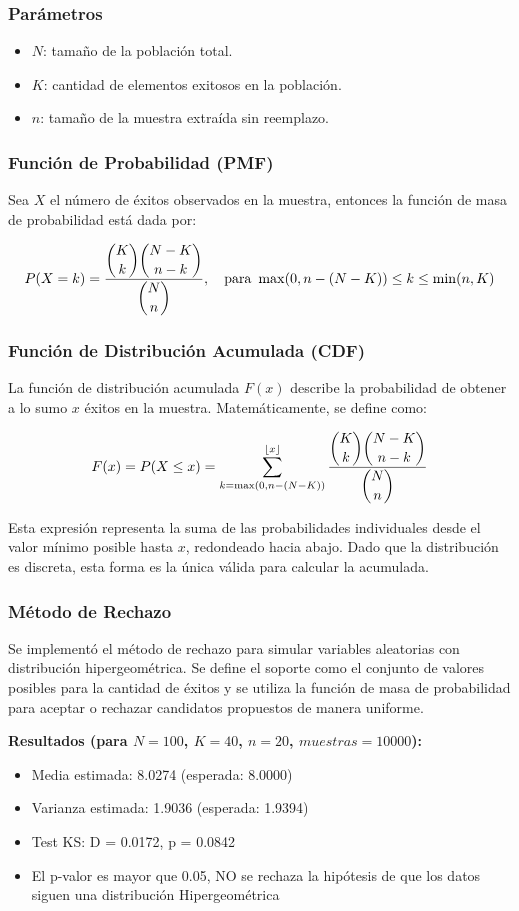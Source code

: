 \documentclass{article}
\begin{document}
\subsubsection*{Parámetros}
\begin{itemize}
  \item $N$: tamaño de la población total.
  \item $K$: cantidad de elementos exitosos en la población.
  \item $n$: tamaño de la muestra extraída sin reemplazo.
\end{itemize}

\subsubsection*{Función de Probabilidad (PMF)}
Sea $X$ el número de éxitos observados en la muestra, entonces la función de masa de probabilidad está dada por:

\[
P(X = k) = \frac{\dbinom{K}{k} \dbinom{N-K}{n-k}}{\dbinom{N}{n}}, \quad \text{para } \max(0, n - (N-K)) \leq k \leq \min(n, K)
\]

\subsubsection*{Función de Distribución Acumulada (CDF)}
La función de distribución acumulada $F(x)$ describe la probabilidad de obtener a lo sumo $x$ éxitos en la muestra. Matemáticamente, se define como:

\[
F(x) = P(X \leq x) = \sum_{k = \max(0, n - (N-K))}^{\lfloor x \rfloor} \frac{\dbinom{K}{k} \dbinom{N-K}{n-k}}{\dbinom{N}{n}}
\]

Esta expresión representa la suma de las probabilidades individuales desde el valor mínimo posible hasta $x$, redondeado hacia abajo. Dado que la distribución es discreta, esta forma es la única válida para calcular la acumulada.


\vspace{0.5em}
\subsubsection{Método de Rechazo}
Se implementó el método de rechazo para simular variables aleatorias con distribución hipergeométrica. Se define el soporte como el conjunto de valores posibles para la cantidad de éxitos y se utiliza la función de masa de probabilidad para aceptar o rechazar candidatos propuestos de manera uniforme.

\textbf{Resultados (para $N=100$, $K=40$, $n=20$, $muestras=10000$):}
\begin{itemize}
  \item Media estimada: 8.0274 (esperada: 8.0000)
  \item Varianza estimada: 1.9036 (esperada: 1.9394)
  \item Test KS: D = 0.0172, p = 0.0842
  \item El p-valor es mayor que 0.05, NO se rechaza la hipótesis de que los datos siguen una distribución Hipergeométrica
\end{itemize}
\end{document}
